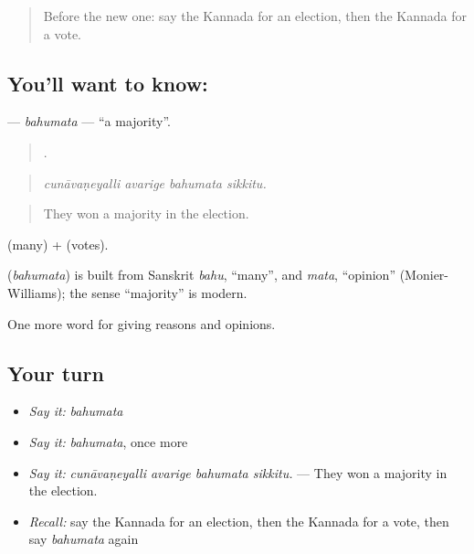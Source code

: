 \label{lesson:KA-C392-bahumata}



\begin{quote}
Before the new one: say the Kannada for an election, then the Kannada for a vote.
\end{quote}

\subsection*{You'll want to know: }
\textbf{} — \emph{bahumata} — \textquotedblleft{}a majority\textquotedblright{}.

\begin{quote}
   .
\end{quote}

\begin{quote}
\emph{cunāvaṇeyalli avarige bahumata sikkitu.}
\end{quote}

\begin{quote}
They won a majority in the election.
\end{quote}

 (many) +  (votes).

\begin{cousinweb}
\textbf{} (\emph{bahumata}) is built from Sanskrit \emph{bahu}, \textquotedblleft{}many\textquotedblright{}, and \emph{mata}, \textquotedblleft{}opinion\textquotedblright{} (Monier-Williams); the sense \textquotedblleft{}majority\textquotedblright{} is modern.
\end{cousinweb}

\begin{grammarlens}[title={What you've built}]
One more word for giving reasons and opinions.
\end{grammarlens}

\subsection*{Your turn}
\begin{itemize}
\raggedright
  \item \emph{Say it:} \emph{bahumata}
  \item \emph{Say it:} \emph{bahumata}, once more
  \item \emph{Say it:} \emph{cunāvaṇeyalli avarige bahumata sikkitu.} — They won a majority in the election.
  \item \emph{Recall:} say the Kannada for an election, then the Kannada for a vote, then say \emph{bahumata} again
\end{itemize}

